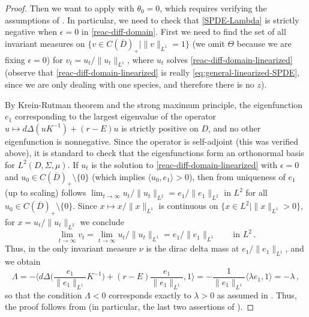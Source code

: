 \documentclass[final]{amsart}
\numberwithin{thm}{section}
\numberwithin{equation}{section}
\newcommand{\ip}[2]{\langle #1, #2 \rangle}
\newcommand{\cdom}{C(\overline D)_+}
\begin{document}
\begin{proof}
Then we want to apply  with $\theta_0 = 0$, which requires verifying the assumptions of . In particular, we need to check that \eqref{SPDE-Lambda} is strictly negative when $\epsilon = 0$ in \eqref{reac-diff-domain}. First we need to find the set of all invariant measures on $\{v \in \cdom \mid \|v\|_{L^1} = 1\}$ (we omit $\Theta$ because we are fixing $\epsilon = 0$) for $v_t = u_t/\|u_t\|_{L^1}$, where $u_t$ solves \eqref{reac-diff-domain-linearized} (observe that \eqref{reac-diff-domain-linearized} is really \eqref{eq:general-linearized-SPDE}, since we are only dealing with one species, and therefore there is no $z$).


By Krein-Rutman theorem and the strong maximum principle, the eigenfunction $e_1$ corresponding to the largest eigenvalue of the operator $u \mapsto d\Delta(u K^{-1}) + (r - E)u$ is strictly positive on $D$, and no other eigenfunction is nonnegative. Since the operator is self-adjoint (this was verified above), it is standard to check that the eigenfunctions form an orthonormal basis for $L^2(D,\Sigma,\mu)$. 
If $u_t$ is the solution to \eqref{reac-diff-domain-linearized} with $\epsilon = 0$ and 
$u_0 \in C(\overline{D})_{+} \setminus \{0\}$ (which implies $\ip{u_0}{e_1} > 0$), then 
 from uniqueness of $e_1$ (up to scaling) follows $\lim_{t \to \infty} u_t/\|u_t\|_{L^2} = e_1/\|e_1\|_{L^2}$ in $L^2$ for all $u_0 \in \cdom \setminus\{0\}$. 
Since $x \mapsto x/\|x\|_{L^1}$ is continuous on $\{x \in L^2 \mid \|x\|_{L^1} > 0\}$, for $x = u_t/\|u_t\|_{L^2}$
we conclude
$$\lim_{t \to \infty} v_t = \lim_{t \to \infty} u_t/\|u_t\|_{L^1} = e_1/\|e_1\|_{L^1}
\qquad \textrm{in } L^2 \,. 
$$
Thus, in  the only invariant measure $\nu$ is the dirac delta mass at $e_1/\|e_1\|_{L^1}$, and we obtain
$$
\Lambda = -\Big\langle d\Delta\Big(\frac{e_1}{\|e_1\|_{L^1}} K^{-1}\Big) + (r - E)\frac{e_1}{\|e_1\|_{L^1}}, 1\Big\rangle = -\frac{1}{\|e_1\|_{L^1}}\ip{\lambda e_1}{1} = -\lambda \,,$$
so that the condition $\Lambda < 0$ corresponds exactly to $\lambda > 0$ as assumed in . Thus, the proof follows from  (in particular, the last two assertions of ).


\end{proof}
\end{document}
